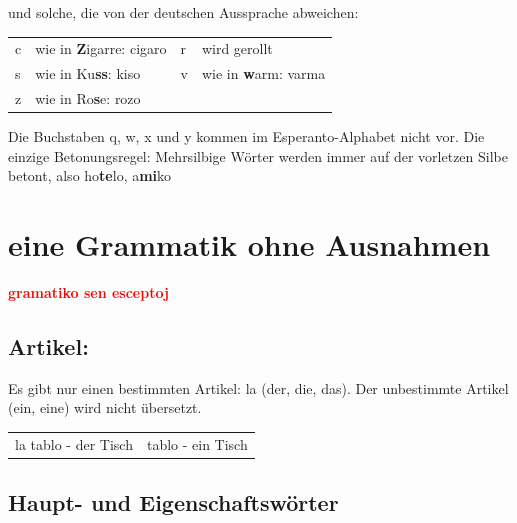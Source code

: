 und solche, die von der deutschen Aussprache abweichen:

\begin{tabular}{llll}
c& wie in \textbf{Z}igarre: cigaro&
r& wird gerollt\\
s& wie in Ku\textbf{ss}: kiso&
v& wie in \textbf{w}arm: varma\\
z& wie in Ro\textbf{s}e: rozo& &\\
\end{tabular}

Die Buchstaben q, w, x und y kommen im Esperanto-Alphabet nicht vor.
Die einzige Betonungsregel: Mehrsilbige Wörter werden immer auf der vorletzen Silbe betont, also ho\textbf{te}lo, a\textbf{mi}ko
\clearpage

\vspace{-.6cm}

\section{eine Grammatik ohne Ausnahmen}

\vspace{-.2cm}

\begin{flushright}
\textbf{\large \textcolor{red}{gramatiko sen esceptoj}}
\end{flushright}

\vspace{-.7cm}

\subsection{Artikel:}

\vspace{-.2cm}

Es gibt nur einen bestimmten Artikel: la (der, die, das). Der unbestimmte Artikel (ein, eine) wird nicht übersetzt.

\begin{tabular}{ll}
la tablo - der Tisch  & tablo - ein Tisch
\end{tabular}

\vspace{-.3cm}

\subsection{Haupt- und Eigenschaftswörter}

\vspace{-.1cm}

